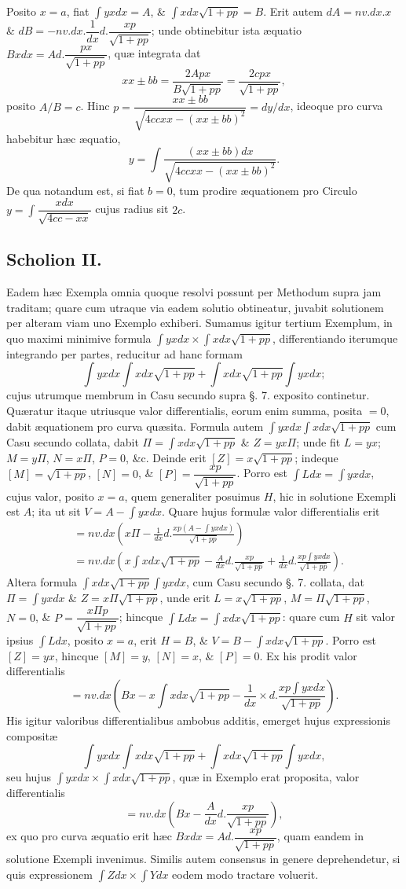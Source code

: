 Posito $x=a$, fiat $\int yxdx=A$, \& $\int xdx\sqrt{1+pp}=B$. Erit autem $dA=nv.dx.x$ \& $dB=-nv.dx.\dfrac{1}{dx}d.\dfrac{xp}{\sqrt{1+pp}}$; unde obtinebitur ista æquatio $Bxdx=Ad.\dfrac{px}{\sqrt{1+pp}}$, quæ integrata dat
\[xx\pm bb=\frac{2Apx}{B\sqrt{1+pp}}=\frac{2cpx}{\sqrt{1+pp}},\]
posito $A/B=c$. Hinc $p=\dfrac{xx\pm bb}{\sqrt{4ccxx-(xx\pm bb)^2}}=dy/dx$, ideoque pro curva habebitur hæc æquatio,
\[y=\int\frac{(xx\pm bb)dx}{\sqrt{4ccxx-(xx\pm bb)^2}}.\]
De qua notandum est, si fiat $b=0$, tum prodire æquationem pro Circulo $y=\int\dfrac{xdx}{\sqrt{4cc-xx}}$ cujus radius sit $2c$.
\subsection*{Scholion II.}
Eadem hæc Exempla omnia quoque resolvi possunt per Methodum supra jam traditam; quare cum utraque via eadem solutio obtineatur, juvabit solutionem per alteram viam uno Exemplo exhiberi. Sumamus igitur tertium Exemplum, in quo maximi minimive formula $\int yxdx\times\int xdx\sqrt{1+pp}$, differentiando iterumque integrando per partes, reducitur ad hanc formam
\[\int yxdx\int xdx\sqrt{1+pp}+\int xdx\sqrt{1+pp}\int yxdx;\]
cujus utrumque membrum in Casu secundo supra §. 7. exposito continetur. Quæratur itaque utriusque valor differentialis, eorum enim summa, posita $=0$, dabit æquationem pro curva quæsita. Formula autem $\int yxdx\int xdx\sqrt{1+pp}$ cum Casu secundo collata, dabit $\Pi=\int xdx\sqrt{1+pp}$ \& $Z=yx\Pi$; unde fit $L=yx$; $M=y\Pi$, $N=x\Pi$, $P=0$, \&c. Deinde erit $[Z]=x\sqrt{1+pp}$; indeque $[M]=\sqrt{1+pp}$, $[N]=0$, \& $[P]=\dfrac{xp}{\sqrt{1+pp}}$. Porro est $\int Ldx=\int yxdx$, cujus valor, posito $x=a$, quem generaliter posuimus $H$, hic in solutione Exempli est $A$; ita ut sit $V=A-\int yxdx$. Quare hujus formulæ valor differentialis erit
\[\begin{aligned}&=nv.dx\left(x\Pi-\frac{1}{dx}d.\frac{xp(A-\int yxdx)}{\sqrt{1+pp}}\right)\\&=nv.dx\left(x\int xdx\sqrt{1+pp}-\frac{A}{dx}d.\frac{xp}{\sqrt{1+pp}}+\frac{1}{dx}d.\frac{xp\int yxdx}{\sqrt{1+pp}}\right).\end{aligned}\]
Altera formula $\int xdx\sqrt{1+pp}\int yxdx$, cum Casu secundo §. 7. collata, dat $\Pi=\int yxdx$ \& $Z=x\Pi\sqrt{1+pp}$, unde erit $L=x\sqrt{1+pp}$, $M=\Pi\sqrt{1+pp}$, $N=0$, \& $P=\dfrac{x\Pi p}{\sqrt{1+pp}}$; hincque $\int Ldx=\int xdx\sqrt{1+pp}$: quare cum $H$ sit valor ipsius $\int Ldx$, posito $x=a$, erit $H=B$, \& $V=B-\int xdx\sqrt{1+pp}$. Porro est $[Z]=yx$, hincque $[M]=y$, $[N]=x$, \& $[P]=0$. Ex his prodit valor differentialis
\[=nv.dx\left(Bx-x\int xdx\sqrt{1+pp}-\frac{1}{dx}\times d.\frac{xp\int yxdx}{\sqrt{1+pp}}\right).\]
His igitur valoribus differentialibus ambobus additis, emerget hujus expressionis compositæ
\[\int yxdx\int xdx\sqrt{1+pp}+\int xdx\sqrt{1+pp}\int yxdx,\]
seu hujus $\int yxdx\times\int xdx\sqrt{1+pp}$, quæ in Exemplo erat proposita, valor differentialis
\[=nv.dx\left(Bx-\frac{A}{dx}d.\frac{xp}{\sqrt{1+pp}}\right),\]
ex quo pro curva æquatio erit hæc $Bxdx=Ad.\dfrac{xp}{\sqrt{1+pp}}$, quam eandem in solutione Exempli invenimus. Similis autem consensus in genere deprehendetur, si quis expressionem $\int Zdx\times\int Ydx$ eodem modo tractare voluerit.

